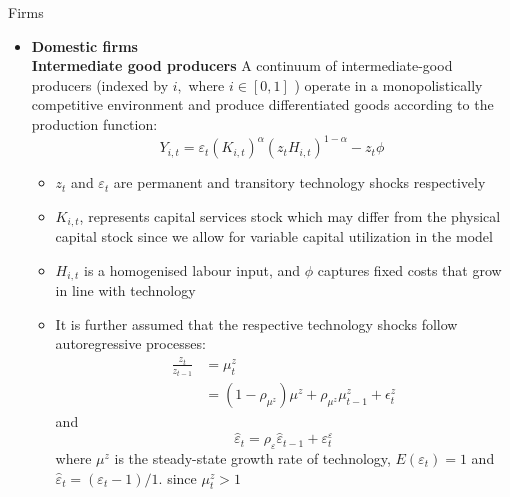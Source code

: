 \documentclass[9pt]{beamer}
\let\olditem\item
\renewcommand{\item}{%
\olditem\vspace{\fill}}
\begin{document}
\begin{frame}{Firms}
\begin{itemize}
    \item \textbf{Domestic firms} \\
    
    \textbf{Intermediate good producers} A continuum of intermediate-good producers (indexed by $i,$ where $i \in[0,1]$ ) operate in a monopolistically competitive environment and produce differentiated goods according to the production function:
$$
Y_{i, t}=\varepsilon_{t}\left(K_{i, t}\right)^{\alpha}\left(z_{t} H_{i, t}\right)^{1-\alpha}-z_{t} \phi
$$
    \begin{itemize}
        
    \item $z_t$ and $\varepsilon_t$ are permanent and transitory technology shocks respectively  
    
    \item $K_{i,t}$, represents capital services stock which may differ from the physical capital stock since we allow for variable capital utilization in the model 
    
    \item $H_{i,t}$ is a homogenised labour input, and $\phi$ captures fixed costs that grow in line with technology 
    
   \item It is further assumed that the respective technology shocks follow autoregressive processes:
$$
    \begin{aligned}
    \frac{z_{t}}{z_{t-1}} &=\mu_{t}^{z} \\
    &=\left(1-\rho_{\mu^{z}}\right) \mu^{z}+\rho_{\mu^{z}} \mu_{t-1}^{z}+\epsilon_{t}^{z}
    \end{aligned}
$$
and
$$
    \hat{\varepsilon}_{t}=\rho_{\varepsilon} \hat{\varepsilon}_{t-1}+\varepsilon_{t}^{\varepsilon}
$$
where $\mu^{z}$ is the steady-state growth rate of technology, $E\left(\varepsilon_{t}\right)=1$ and $\hat{\varepsilon}_{t}=\left(\varepsilon_{t}-1\right) / 1 .$ since $\mu_{t}^{z}>1$

\end{itemize}
\end{itemize}


\end{frame}
\end{document}
